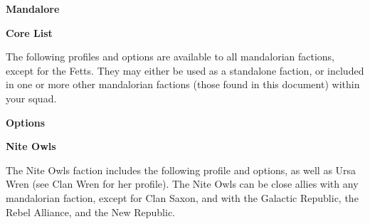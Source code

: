 \documentclass{article}
\begin{document}
{\Huge \textbf{Mandalore}}
\vspace{0.6cm}

{\Large \textbf{Core List}}
\vspace{0.3cm}

\begin{minipage}{19cm}
    The following profiles and options are available to all mandalorian factions, except for the Fetts.
    They may either be used as a standalone faction, or included in one or more 
    other mandalorian factions (those found in this document) within your squad.
\end{minipage}

\vspace{0.3cm}
{\scriptsize
\setlength\extrarowheight{1.5pt}

}
\vspace{0.6cm}

{\large \textbf{Options}}
\vspace{0.3cm}
\begin{multicols}{2}
    {\scriptsize

    \setlength\extrarowheight{1.5pt}
    

    \vspace{0.6cm}

    \setlength\extrarowheight{1.5pt}
    

    \vspace{0.6cm}

    \setlength\extrarowheight{1.5pt}
    

    \vspace{0.6cm}

    \setlength\extrarowheight{1.5pt}
    

    }
\end{multicols}

\newpage

{\Large \textbf{Nite Owls}}
\vspace{0.3cm}

\begin{minipage}{19cm}
    The Nite Owls faction includes the following profile and options, as well as
    Ursa Wren (see Clan Wren for her profile). The Nite Owls can be close allies with
    any mandalorian faction, except for Clan Saxon, and with the Galactic Republic,
    the Rebel Alliance, and the New Republic.
\end{minipage}
\end{document}
